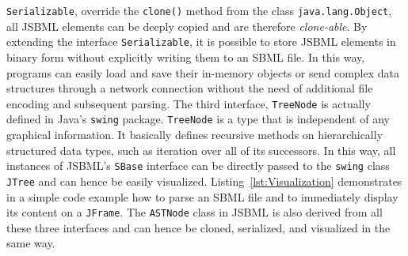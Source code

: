 \texttt{Serializable}, %
%
override the \texttt{clone()} method from the class \texttt{java.lang.Object},
%
all JSBML elements can be deeply copied and are therefore \emph{clone-able}. By
extending the interface \texttt{Serializable},
%
it is possible to store JSBML
%
elements in binary form without explicitly writing them to an SBML file.
%
In this way, programs can easily load and save their in-memory objects or send
complex data structures through a network connection without the need of
additional file encoding and subsequent parsing. The third interface,
\texttt{TreeNode}%
is actually defined in Java's \texttt{swing}
%
package.
\texttt{TreeNode} is a type that is independent of any graphical information. It
basically defines recursive methods on hierarchically structured data types,
such as iteration over all of its successors. In this way, all instances of
JSBML's%
\texttt{SBase} interface can be directly passed to the \texttt{swing}
%
class \texttt{JTree}
%
and can hence be easily visualized. Listing~\vref{lst:Visualization}
demonstrates in a simple code example how to parse an SBML file
%
and to immediately display its content on a \texttt{JFrame}.
%
%
The \texttt{ASTNode} class in JSBML is also
derived from all these three interfaces and can hence be cloned, serialized, and
visualized in the same way.

